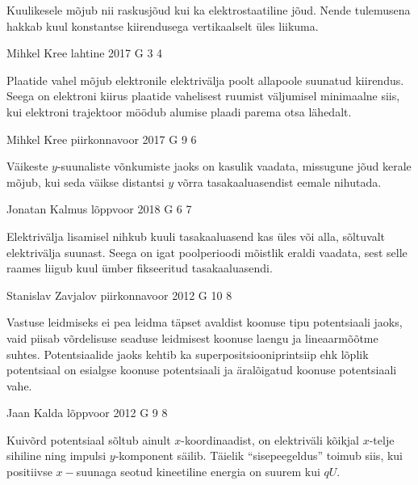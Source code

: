 \documentclass[11pt]{article}
\begin{document}
{{\ifHint
Kuulikesele mõjub nii raskusjõud kui ka elektrostaatiline jõud. Nende tulemusena hakkab kuul konstantse kiirendusega vertikaalselt üles liikuma.
\fi
}

{Mihkel Kree} %
{lahtine} %
{2017} %
{G 3} %
{4} %
{

\ifHint
Plaatide vahel mõjub elektronile elektrivälja poolt allapoole suunatud kiirendus. Seega on elektroni kiirus plaatide vahelisest ruumist väljumisel minimaalne siis, kui elektroni trajektoor möödub alumise plaadi parema otsa lähedalt.
\fi
}

{Mihkel Kree} %
{piirkonnavoor} %
{2017} %
{G 9} %
{6} %
{

\ifHint
Väikeste $y$-suunaliste võnkumiste jaoks on kasulik vaadata, missugune jõud kerale mõjub, kui seda väikse distantsi $y$ võrra tasakaaluasendist eemale nihutada.
\fi
}

{Jonatan Kalmus} %
{lõppvoor} %
{2018} %
{G 6} %
{7} %
{

\ifHint
Elektrivälja lisamisel nihkub kuuli tasakaaluasend kas üles või alla, sõltuvalt elektrivälja suunast. Seega on igat poolperioodi mõistlik eraldi vaadata, sest selle raames liigub kuul ümber fikseeritud tasakaaluasendi.
\fi
}

{Stanislav Zavjalov} %
{piirkonnavoor} %
{2012} %
{G 10} %
{8} %
{

\ifHint
Vastuse leidmiseks ei pea leidma täpset avaldist koonuse tipu potentsiaali jaoks, vaid piisab võrdelisuse seaduse leidmisest koonuse laengu ja lineaarmõõtme suhtes. Potentsiaalide jaoks kehtib ka superpositsiooniprintsiip ehk lõplik potentsiaal on esialgse koonuse potentsiaali ja äralõigatud koonuse potentsiaali vahe.
\fi
}

{Jaan Kalda} %
{lõppvoor} %
{2012} %
{G 9} %
{8} %
{

\ifHint
Kuivõrd potentsiaal sõltub ainult $x$-koordinaadist, on elektriväli kõikjal $x$-telje sihiline ning
impulsi $y$-komponent säilib. Täielik \enquote{sisepeegeldus} toimub siis, kui positiivse $x-$suunaga 
seotud kineetiline energia on suurem kui $qU$.
\fi
}

}
\end{document}
